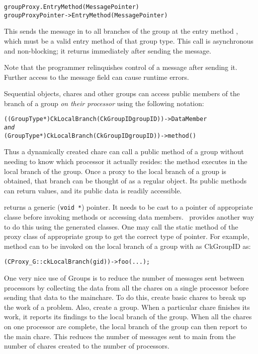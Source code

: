\begin{alltt}
 groupProxy.EntryMethod(MessagePointer)
 groupProxyPointer->EntryMethod(MessagePointer)
\end{alltt}

This sends the message in  to all branches of the group at
the entry method , which must be a valid entry method of that
group type. This call is asynchronous and non-blocking; it returns immediately
after sending the message.

Note that the programmer relinquishes control of a message after sending it.
Further access to the message field can cause runtime errors.


Sequential objects, chares and other groups can access public members of the
branch of a group  {\it on their processor} using
the following notation:

\begin{alltt}
((GroupType*)CkLocalBranch(CkGroupID groupID))->DataMember
{\em and} 
(GroupType*)CkLocalBranch(CkGroupID groupID))->method() 
\end{alltt}

Thus a dynamically created chare can call a public method of a
group without needing to know which processor it actually resides: the method
executes in the local branch of the group.  Once a proxy to the
local branch of a group is obtained, that branch can be thought of as a regular
object.  Its public methods can return values, and its public data is readily
accessible.   

 returns a generic (\texttt{void *}) pointer.  It needs to be
cast to a pointer of appropriate classe before invoking methods or accessing
data members. \charmpp\ provides another way to do this using the generated
 classes. One may call the static method
 of the proxy class of appropriate group to get the correct
type of pointer.  For example, method  can to be invoked on the local
branch of a group  with  as CkGroupID as:

\begin{alltt}
(CProxy_G::ckLocalBranch(gid))->foo(...);
\end{alltt}

One very nice use of Groups is to reduce the number of messages sent between
processors by collecting the data from all the chares on a single processor
before sending that data to the mainchare.  To do this, create basic chares to
break up the work of a problem.  Also, create a group.  When a particular chare
finishes its work, it reports its findings to the local branch of the group.
When all the chares on one processor are complete, the local branch of the
group can then report to the main chare.  This reduces the number of messages
sent to main from the number of chares created to the number of processors.     

